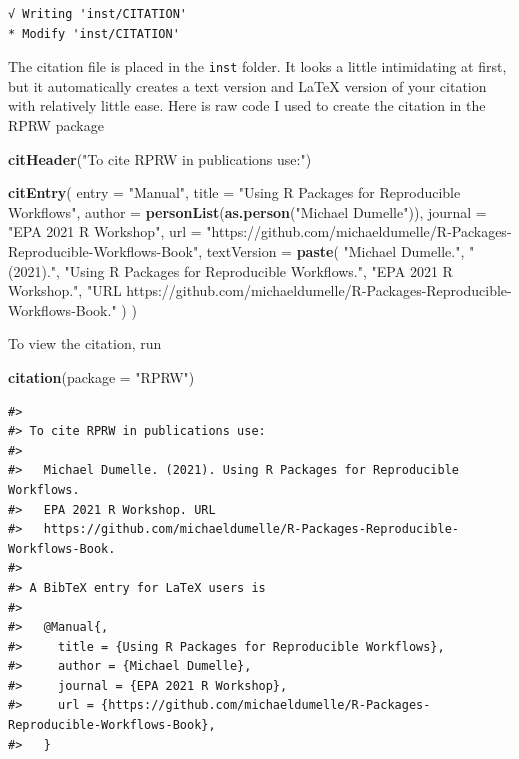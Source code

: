 \documentclass[
]{book}
\newenvironment{Shaded}{\begin{snugshade}}{\end{snugshade}}
\newcommand{\DataTypeTok}[1]{\textcolor[rgb]{0.13,0.29,0.53}{#1}}
\newcommand{\KeywordTok}[1]{\textcolor[rgb]{0.13,0.29,0.53}{\textbf{#1}}}
\newcommand{\NormalTok}[1]{#1}
\newcommand{\StringTok}[1]{\textcolor[rgb]{0.31,0.60,0.02}{#1}}
\begin{document}
\begin{verbatim}
√ Writing 'inst/CITATION'
* Modify 'inst/CITATION'
\end{verbatim}

The citation file is placed in the \texttt{inst} folder. It looks a little intimidating at first, but it automatically creates a text version and LaTeX version of your citation with relatively little ease. Here is raw code I used to create the citation in the RPRW package

\begin{Shaded}
\begin{Highlighting}[]
\KeywordTok{citHeader}\NormalTok{(}\StringTok{"To cite RPRW in publications use:"}\NormalTok{)}

\KeywordTok{citEntry}\NormalTok{(}
  \DataTypeTok{entry    =} \StringTok{"Manual"}\NormalTok{,}
  \DataTypeTok{title    =} \StringTok{"Using R Packages for Reproducible Workflows"}\NormalTok{,}
  \DataTypeTok{author   =} \KeywordTok{personList}\NormalTok{(}\KeywordTok{as.person}\NormalTok{(}\StringTok{"Michael Dumelle"}\NormalTok{)),}
  \DataTypeTok{journal  =} \StringTok{"EPA 2021 R Workshop"}\NormalTok{,}
  \DataTypeTok{url      =} \StringTok{"https://github.com/michaeldumelle/R-Packages-Reproducible-Workflows-Book"}\NormalTok{,}
  \DataTypeTok{textVersion =}
  \KeywordTok{paste}\NormalTok{(}
    \StringTok{"Michael Dumelle."}\NormalTok{,}
    \StringTok{"(2021)."}\NormalTok{,}
    \StringTok{"Using R Packages for Reproducible Workflows."}\NormalTok{,}
    \StringTok{"EPA 2021 R Workshop."}\NormalTok{,}
    \StringTok{"URL https://github.com/michaeldumelle/R-Packages-Reproducible-Workflows-Book."}
\NormalTok{  )}
\NormalTok{)}
\end{Highlighting}
\end{Shaded}

To view the citation, run

\begin{Shaded}
\begin{Highlighting}[]
\KeywordTok{citation}\NormalTok{(}\DataTypeTok{package =} \StringTok{"RPRW"}\NormalTok{)}
\end{Highlighting}
\end{Shaded}

\begin{verbatim}
#> 
#> To cite RPRW in publications use:
#> 
#>   Michael Dumelle. (2021). Using R Packages for Reproducible Workflows.
#>   EPA 2021 R Workshop. URL
#>   https://github.com/michaeldumelle/R-Packages-Reproducible-Workflows-Book.
#> 
#> A BibTeX entry for LaTeX users is
#> 
#>   @Manual{,
#>     title = {Using R Packages for Reproducible Workflows},
#>     author = {Michael Dumelle},
#>     journal = {EPA 2021 R Workshop},
#>     url = {https://github.com/michaeldumelle/R-Packages-Reproducible-Workflows-Book},
#>   }
\end{verbatim}
\end{document}
